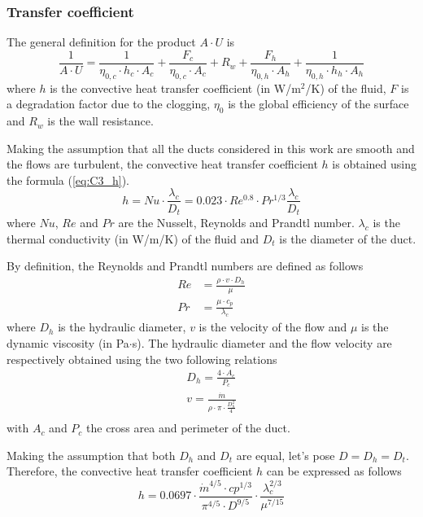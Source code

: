 \subsubsection{Transfer coefficient}
The general definition for the product \(A\cdot U\) is
\begin{equation}
    \frac{1}{A\cdot U}  = \frac{1}{\eta_{0,c}\cdot h_c \cdot A_c} + \frac{F_c}{\eta_{0,c}\cdot A_c} + R_w + \frac{F_h}{\eta_{0,h}\cdot A_h} + \frac{1}{\eta_{0,h}\cdot h_h \cdot A_h}\label{eq:C3_AU}
\end{equation}
where \(h\) is the convective heat transfer coefficient (in W/m$^2$/K) of the fluid, \(F\) is a degradation factor due to the clogging, \(\eta_0\) is the global efficiency of the surface and \(R_w\) is the wall resistance.

Making the assumption that all the ducts considered in this work are smooth and the flows are turbulent, the convective heat transfer coefficient \(h\) is obtained using the formula (\ref{eq:C3_h}).
\begin{equation}
    h = Nu \cdot \frac{\lambda_c}{D_t} = 0.023\cdot Re^{0.8}\cdot Pr^{1/3}\frac{\lambda_c}{D_t}\label{eq:C3_h}
\end{equation}
where \(Nu\), \(Re\) and \(Pr\) are the Nusselt, Reynolds and Prandtl number. \(\lambda_c\) is the thermal conductivity (in W/m/K) of the fluid and \(D_t\) is the diameter of the duct\cite{Ngendakumana2018}.

By definition, the Reynolds and Prandtl numbers are defined as follows
\begin{align}
    Re & = \frac{\rho\cdot v\cdot D_h}{\mu}\label{eq:C3_Re} \\
    Pr & = \frac{\mu\cdot c_p}{\lambda_c}\label{eq:C3_Pr}
\end{align}
where \(D_h\) is the hydraulic diameter, \(v\) is the velocity of the flow and \(\mu\) is the dynamic viscosity (in Pa$\cdot$s). The hydraulic diameter and the flow velocity are respectively obtained using the two following relations
\begin{align}
    D_h = \frac{4\cdot A_c}{P_c}\label{eq:C3_Dh}                      \\
    v=\frac{\dot{m}}{\rho\cdot\pi\cdot\frac{D_h^2}{4}}\label{eq:C3_v} \\
\end{align}
with \(A_c\) and \(P_c\) the cross area and perimeter of the duct\cite{Ngendakumana2018}.

Making the assumption that both \(D_h\) and \(D_t\) are equal, let's pose \(D=D_h=D_t\). Therefore, the convective heat transfer coefficient \(h\) can be expressed as follows
\begin{equation}
    h = 0.0697\cdot \frac{\dot{m}^{4/5}\cdot cp^{1/3}}{\pi^{4/5}\cdot D^{9/5}}\cdot \frac{\lambda_c^{2/3}}{\mu^{7/15}}
\end{equation}

